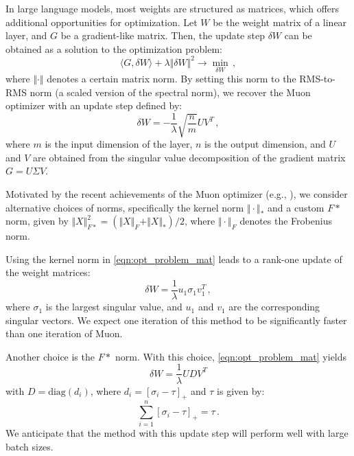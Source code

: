 \documentclass[]{scrartcl}
\newcommand{\norm}[1]{\Vert{#1}\Vert}
\begin{document}
In large language models, most weights are structured as matrices, which offers additional opportunities for optimization. Let $W$ be the weight matrix of a linear layer, and $G$ be a gradient-like matrix. Then, the update step $\delta W$ can be obtained as a solution to the optimization problem:
\begin{equation}\label{eqn:opt_problem_mat}
  \langle G, \delta W \rangle + \lambda \norm{\delta W}^2 \to \min_{\delta W}\,,
\end{equation}
where $\norm{\cdot}$ denotes a certain matrix norm. By setting this norm to the RMS-to-RMS norm (a scaled version of the spectral norm), we recover the Muon optimizer \cite{bernstein2025deriving, bernstein2024oldoptimizernewnorm} with an update step defined by:
\begin{equation}\label{eqn:update_muon}
\delta W = - \frac{1}{\lambda}\sqrt{\frac{n}{m}}UV^T\,,
\end{equation}
where $m$ is the input dimension of the layer, $n$ is the output dimension, and $U$ and $V$ are obtained from the singular value decomposition of the gradient matrix $G = U \Sigma V$.

Motivated by the recent achievements of the Muon optimizer (e.g., \cite{liu2025muon}), we consider alternative choices of norms, specifically the kernel norm $\norm{\cdot}_*$ and a custom $F*$ norm, given by $\norm{X}_{F*}^2 = (\norm{X}_F + \norm{X}_*)/2$, where $\norm{\cdot}_F$ denotes the Frobenius norm.

Using the kernel norm in \eqref{eqn:opt_problem_mat} leads to a rank-one update of the weight matrices:
\begin{equation}\label{eqn:update_star}
  \delta W = \frac{1}{\lambda} u_1 \sigma_1 v_1^T\,,
\end{equation}
where $\sigma_1$ is the largest singular value, and $u_1$ and $v_1$ are the corresponding singular vectors. We expect one iteration of this method to be significantly faster than one iteration of Muon.

Another choice is the $F*$ norm. With this choice, \eqref{eqn:opt_problem_mat} yields 
\begin{equation}\label{eqn:update_F_star}
\delta W = \frac{1}{\lambda}UDV^T
\end{equation} 
with $D = \text{diag}(d_i)$, where $d_i = [\sigma_i - \tau]_+$ and $\tau$ is given by:
\begin{equation}
    \sum_{i=1}^n [\sigma_i - \tau]_+ = \tau\,.
\end{equation}
We anticipate that the method with this update step will perform well with large batch sizes.
\end{document}
